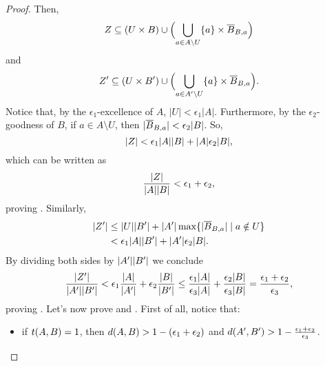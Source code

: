\begin{lemma}
\begin{proof}
                Then,
                \[
                    Z \subseteq (U \times B) \cup \Bigl( \bigcup_{a \in A \setminus U} \{ a \} \times \overline{B}_{B,a} \Bigr)
                \]
                and
                \[
                    Z' \subseteq (U \times B') \cup \Bigl( \bigcup_{a \in A' \setminus U} \{ a \} \times \overline{B}_{B,a} \Bigr).
                \]
                Notice that, by the $\epsilon_1$-excellence of $A$, $|U| < \epsilon_1 |A|$.
                Furthermore, by the $\epsilon_2$-goodness of $B$,
                if $a \in A \setminus U$, then $| \overline{B}_{B,a} | < \epsilon_2 | B |$.
                So,
                \[
                    | Z | < \epsilon_1 | A | | B | + | A | \epsilon_2 | B |,
                \]
                which can be written as
                \[
                        \frac{| Z |}{| A | | B |} < \epsilon_1 + \epsilon_2,
                \]
                proving .
                Similarly,
                \begin{align*}
                    | Z' | & \leq | U | | B' | + | A' | \max \{ | \overline{B}_{B,a} | \mid a \notin U \} \\
                                     & < \epsilon_1 | A | | B' | + | A' | \epsilon_2 | B |.
                \end{align*}
                By dividing both sides by $| A' | | B' |$ we conclude
                \[
                    \frac{| Z' |}{| A' | | B' |} < \epsilon_1 \frac{| A |}{| A' |} + \epsilon_2 \frac{| B |}{| B' |}
                    \leq \frac{\epsilon_1 | A |}{\epsilon_3 | A |} + \frac{\epsilon_2 | B |} {\epsilon_3 | B |}
                    = \frac{\epsilon_1 + \epsilon_2}{\epsilon_3},
                \]
                proving .
                Let's now prove  and .
                First of all, notice that:
                \begin{itemize}
                    \item if $t( A,B ) = 1$, then $d( A,B ) > 1 - ( \epsilon_1 + \epsilon_2 )$
                        and $d ( A',B' ) > 1 - \frac{\epsilon_1 + \epsilon_2}{\epsilon_3}$.

\end{itemize}
\end{proof}
\end{lemma}
